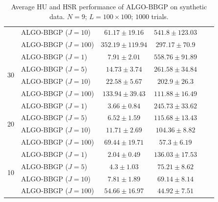 \begin{table}[h]
\begin{adjustbox}{max width=\textwidth}
\begin{tabular}{|c|l|c|c|c|c|}
                    & ALGO-BBGP ($J=10$)           & $61.17    \pm 19.16$  & $541.8    \pm 123.03$ \tabularnewline
                    & ALGO-BBGP ($J=100$)          & $352.19   \pm 119.94$ & $297.17   \pm 70.9$   \tabularnewline \cline{1-4}
\multirow{4}{*}{30} & ALGO-BBGP ($J=1$)            & $7.91     \pm 2.01$   & $558.76   \pm 91.89$  \tabularnewline
                    & ALGO-BBGP ($J=5$)            & $14.73    \pm 3.74$   & $261.58   \pm 34.84$  \tabularnewline
                    & ALGO-BBGP ($J=10$)           & $22.58    \pm 5.67$   & $202.9    \pm 26.3$   \tabularnewline
                    & ALGO-BBGP ($J=100$)          & $133.94   \pm 39.43$  & $111.88   \pm 16.49$  \tabularnewline \cline{1-4}
\multirow{4}{*}{20} & ALGO-BBGP ($J=1$)            & $3.66     \pm 0.84$   & $245.73   \pm 33.62$  \tabularnewline
                    & ALGO-BBGP ($J=5$)            & $6.52     \pm 1.59$   & $115.68   \pm 13.43$  \tabularnewline
                    & ALGO-BBGP ($J=10$)           & $11.71    \pm 2.69$   & $104.36   \pm 8.82$   \tabularnewline
                    & ALGO-BBGP ($J=100$)          & $69.44    \pm 19.71$  & $57.3     \pm 6.19$   \tabularnewline \cline{1-4}
\multirow{4}{*}{10} & ALGO-BBGP ($J=1$)            & $2.04     \pm 0.49$   & $136.03   \pm 17.53$  \tabularnewline
                    & ALGO-BBGP ($J=5$)            & $4.3      \pm 1.03$   & $75.21    \pm 8.62$   \tabularnewline
                    & ALGO-BBGP ($J=10$)           & $7.81     \pm 1.89$   & $69.14    \pm 8.14$   \tabularnewline
                    & ALGO-BBGP ($J=100$)          & $54.66    \pm 16.97$  & $44.92    \pm 7.51$   \tabularnewline \cline{1-4}
\end{tabular}                                                                                                                                                  
\end{adjustbox}                                                                                                                                                
\caption{Average HU and HSR performance of ALGO-BBGP on synthetic data.                                                                                        
         $N = 9$; $L = 100 \times 100$; $1000$ trials.}                                                                                            
\label{table:results_full_BBGP_MO9}
\end{table}


